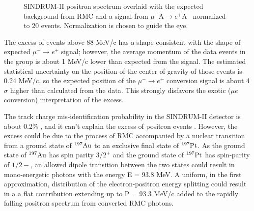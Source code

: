 \documentclass[12pt]{article}
\newcommand {\mumepconv}[1][A] {%
  \def\ArgI{{#1}}%
  \mumepconvRelay
}
\newcommand \mumepconvRelay[1][A]  {\mbox{$\mu^- \textrm{\ArgI} \rightarrow e^+ \textrm{#1}$}}
\newcommand {\Au}[1]     {\mbox{$\rm ^{#1}Au$}}                 %
\begin{document}
\begin{figure}
\caption {
  \label{fig:ana_step2_sindrum_positron_best_fit_signal}
  SINDRUM-II positron spectrum overlaid with the expected background from RMC
  and a signal from \mumepconv\ normalized to 20 events. Normalization is chosen
  to guide the eye.
}
\end{figure}

The excess of events above 88 MeV/c has a shape consistent with the shape
of expected $\mu^- \rightarrow e^+$ signal; however, the average momentum of the
data events in the group is about 1 MeV/c lower than expected from the signal.
The estimated statistical uncertainty on the position of the center of gravity of those
events is 0.24 MeV/c, so the expected position of the $\mu^- \rightarrow e^+$ conversion
signal is about 4$\sigma$ higher than calculated from the data.
This strongly disfavors the exotic ($\mu e$ conversion) interpretation of the excess.

The track charge mis-identification probability in the SINDRUM-II detector
is about 0.2\% \cite{sindrum_ii:Kaulard1998}, and it can't explain the excess
of positron events .
%
However, the excess could be due to the process of RMC accompanied by a nuclear
transition from a ground state of \Au{197} to an exclusive final state
of $^{197}\rm Pt$. As the ground state of \Au{197} has spin parity $3/2^+$
and the ground state of $^{197} \rm Pt$ has spin-parity of $1/2-$,
an allowed dipole transition between the two states could result in mono-energetic
photons with the energy E = 93.8 MeV. A uniform, in the first approximation,
distribution of the electron-positron energy splitting could result in a a flat
contribution extending up to P = 93.3 MeV/c added to the rapidly falling positron
spectrum from converted RMC photons. 
\end{document}
